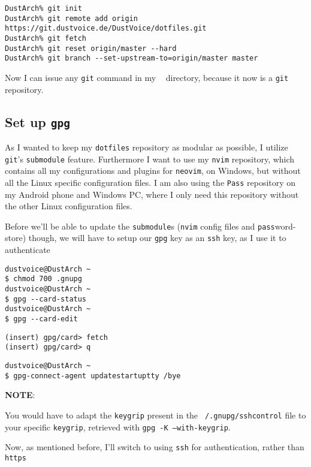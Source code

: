 \documentclass[9pt]{report}
\newcommand{\admonition}[2]{\textbf{#1}: {#2}}
\begin{document}
\begin{verbatim}
DustArch% git init
DustArch% git remote add origin https://git.dustvoice.de/DustVoice/dotfiles.git
DustArch% git fetch
DustArch% git reset origin/master --hard
DustArch% git branch --set-upstream-to=origin/master master
\end{verbatim}

Now I can issue any \texttt{git} command in my \texttt{~} directory, because it now is a \texttt{git} repository.



\vfill\eject

\hypertarget{x-set-up-gpg}{\subsection{Set up \texttt{gpg}}}
As I wanted to keep my \texttt{dotfiles} repository as modular as possible, I utilize \texttt{git}'s \texttt{submodule} feature.
Furthermore I want to use my \texttt{nvim} repository, which contains all my configurations and plugins for \texttt{neovim}, on Windows, but without all the Linux specific configuration files.
I am also using the \texttt{Pass} repository on my Android phone and Windows PC, where I only need this repository without the other Linux configuration files.


Before we’ll be able to update the \texttt{submodule}s (\texttt{nvim} config files and \texttt{pass}word-store) though, we will have to setup our \texttt{gpg} key as an \texttt{ssh} key, as I use it to authenticate


\begin{verbatim}
dustvoice@DustArch ~
$ chmod 700 .gnupg
dustvoice@DustArch ~
$ gpg --card-status
dustvoice@DustArch ~
$ gpg --card-edit
\end{verbatim}

\begin{verbatim}
(insert) gpg/card> fetch
(insert) gpg/card> q
\end{verbatim}

\begin{verbatim}
dustvoice@DustArch ~
$ gpg-connect-agent updatestartuptty /bye
\end{verbatim}

\admonition{NOTE}{You would have to adapt the \texttt{keygrip} present in the \texttt{~/.gnupg/sshcontrol} file to your specific \texttt{keygrip}, retrieved with \texttt{gpg -K --with-keygrip}.

}
Now, as mentioned before, I’ll switch to using \texttt{ssh} for authentication, rather than \texttt{https}
\end{document}
